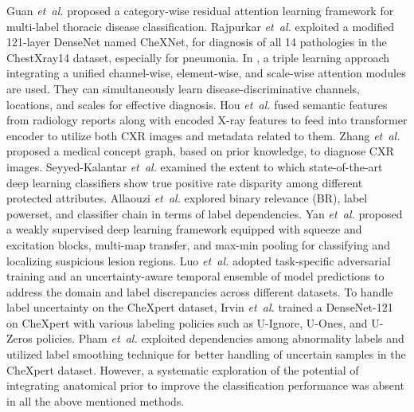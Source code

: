 \documentclass[journal]{IEEEtran}
\newcommand{\etal}{\emph{et~al.}}
\begin{document}
Guan \etal \cite{GUAN2020259} proposed a category-wise residual attention learning framework for multi-label thoracic disease classification. Rajpurkar \etal \cite{Rajpurkar2017CheXNetRP} exploited a modified 121-layer DenseNet named CheXNet, for diagnosis of all 14 pathologies in the ChestXray14 dataset, especially for pneumonia. In \cite{wang2020triple}, a triple learning approach integrating a unified channel-wise, element-wise, and scale-wise attention modules are used. They can simultaneously learn disease-discriminative channels, locations, and scales for effective diagnosis. Hou \etal \cite{Hou2021MultiLabelLW} fused semantic features from radiology reports along with encoded X-ray features to feed into transformer encoder to utilize both CXR images and metadata related to them. Zhang \etal \cite{Zhang_Wang_Xu_Yu_Yuille_Xu_2020} proposed a medical concept graph, based on prior knowledge, to diagnose CXR images. Seyyed-Kalantar \etal \cite{SeyyedKalantari2021CheXclusionFG} examined the extent to which state-of-the-art deep learning classifiers show true positive rate disparity among different protected attributes. Allaouzi \etal \cite{8719904} explored binary relevance (BR), label powerset, and classifier chain in terms of label dependencies. Yan \etal \cite{Yan2018WeaklySD} proposed a weakly supervised deep learning framework equipped with squeeze and excitation blocks, multi-map transfer, and max-min pooling for classifying and localizing suspicious lesion regions. Luo \etal \cite{Luo2020DeepME} adopted task-specific adversarial training and an uncertainty-aware temporal ensemble of model predictions to address the domain and label discrepancies across different datasets. To handle label uncertainty on the CheXpert dataset, Irvin \etal \cite{irvin2019chexpert} trained a DenseNet-121 on CheXpert with various labeling policies such as U-Ignore, U-Ones, and U-Zeros policies. Pham \etal \cite{PHAM2021186} exploited dependencies among abnormality labels and utilized label smoothing technique for better handling of uncertain samples in the CheXpert dataset. However, a systematic exploration of the potential of integrating anatomical prior to improve the classification performance was absent in all the above mentioned methods. 
\end{document}
